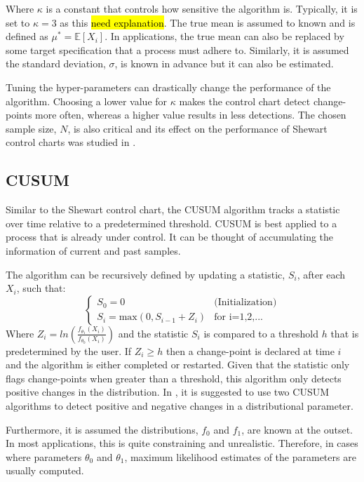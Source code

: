 Where $\kappa$ is a constant that controls how sensitive the algorithm is. Typically, it is set to $\kappa=3$ as this \hl{need explanation}.
The true mean is assumed to known and is defined as $\mu^* = \mathbb{E}[X_i]$. In applications, the true mean can also be replaced by some target specification that a process must adhere to. Similarly, it is assumed the standard deviation, $\sigma$, is known in advance but it can also be estimated.

Tuning the hyper-parameters can drastically change the performance of the algorithm. Choosing a lower value for $\kappa$ makes the control chart detect change-points more often, whereas a higher value results in less detections. The chosen sample size, $N$, is also critical and its effect on the performance of Shewart control charts was studied in \cite{haridy2017effect}.

\subsection{CUSUM}
Similar to the Shewart control chart, the CUSUM algorithm tracks a statistic over time relative to a predetermined threshold. CUSUM is best applied to a process that is already under control. It can be thought of accumulating the information of current and past samples. 

The algorithm can be recursively defined by updating a statistic, $S_i$, after each $X_i$, such that:
\begin{equation}
  \begin{cases}
    S_0 = 0  & \text{(Initialization)} \\
    S_i = \text{max}(0, S_{i-1} + Z_i) & \text{for i=1,2,...}
  \end{cases}
\end{equation}
Where $Z_i=ln(\frac{f_{\theta_1}(X_i)}{f_{\theta_0}(X_i)})$ and the statistic $S_i$ is compared to a threshold $h$ that is predetermined by the user. If $Z_i \geq h$ then a change-point is declared at time $i$ and the algorithm is either completed or restarted. Given that the statistic only flags change-points when greater than a threshold, this algorithm only detects positive changes in the distribution. In \cite{page1954continuous}, it is suggested to use two CUSUM algorithms to detect positive and negative changes in a distributional parameter.

Furthermore, it is assumed the distributions, $f_0$ and $f_1$, are known at the outset. In most applications, this is quite constraining and unrealistic. Therefore, in cases where parameters $\theta_0$ and $\theta_1$, maximum likelihood estimates of the parameters are usually computed.

